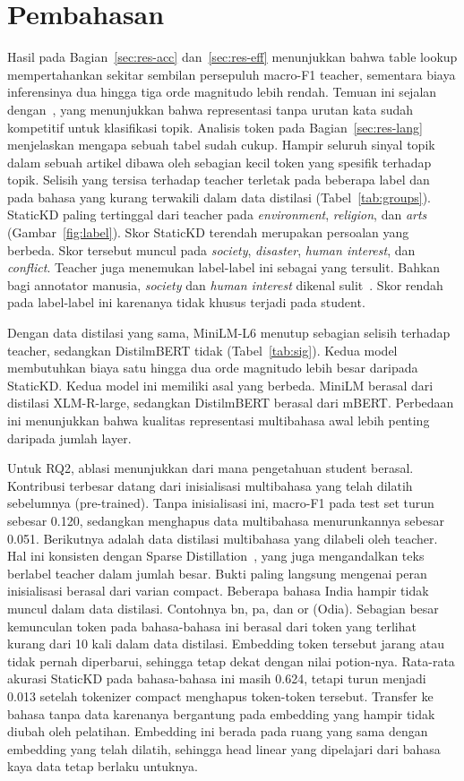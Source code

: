 \documentclass[journal]{IEEEtran}
\begin{document}
\section{Pembahasan}
\label{sec:discussion}
Hasil pada Bagian~\ref{sec:res-acc} dan~\ref{sec:res-eff} menunjukkan bahwa table lookup mempertahankan sekitar sembilan persepuluh macro-F1 teacher, sementara biaya inferensinya dua hingga tiga orde magnitudo lebih rendah. Temuan ini sejalan dengan~\cite{galke2022bow}, yang menunjukkan bahwa representasi tanpa urutan kata sudah kompetitif untuk klasifikasi topik. Analisis token pada Bagian~\ref{sec:res-lang} menjelaskan mengapa sebuah tabel sudah cukup. Hampir seluruh sinyal topik dalam sebuah artikel dibawa oleh sebagian kecil token yang spesifik terhadap topik. Selisih yang tersisa terhadap teacher terletak pada beberapa label dan pada bahasa yang kurang terwakili dalam data distilasi (Tabel~\ref{tab:groups}). StaticKD paling tertinggal dari teacher pada \emph{environment}, \emph{religion}, dan \emph{arts} (Gambar~\ref{fig:label}). Skor StaticKD terendah merupakan persoalan yang berbeda. Skor tersebut muncul pada \emph{society}, \emph{disaster}, \emph{human interest}, dan \emph{conflict}. Teacher juga menemukan label-label ini sebagai yang tersulit. Bahkan bagi annotator manusia, \emph{society} dan \emph{human interest} dikenal sulit~\cite{kuzman2025llm}. Skor rendah pada label-label ini karenanya tidak khusus terjadi pada student.

Dengan data distilasi yang sama, MiniLM-L6 menutup sebagian selisih terhadap teacher, sedangkan DistilmBERT tidak (Tabel~\ref{tab:sig}). Kedua model membutuhkan biaya satu hingga dua orde magnitudo lebih besar daripada StaticKD. Kedua model ini memiliki asal yang berbeda. MiniLM berasal dari distilasi XLM-R-large, sedangkan DistilmBERT berasal dari mBERT. Perbedaan ini menunjukkan bahwa kualitas representasi multibahasa awal lebih penting daripada jumlah layer.

Untuk RQ2, ablasi menunjukkan dari mana pengetahuan student berasal. Kontribusi terbesar datang dari inisialisasi multibahasa yang telah dilatih sebelumnya (pre-trained). Tanpa inisialisasi ini, macro-F1 pada test set turun sebesar 0.120, sedangkan menghapus data multibahasa menurunkannya sebesar 0.051. Berikutnya adalah data distilasi multibahasa yang dilabeli oleh teacher. Hal ini konsisten dengan Sparse Distillation~\cite{ye2022sparse}, yang juga mengandalkan teks berlabel teacher dalam jumlah besar. Bukti paling langsung mengenai peran inisialisasi berasal dari varian compact. Beberapa bahasa India hampir tidak muncul dalam data distilasi. Contohnya bn, pa, dan or (Odia). Sebagian besar kemunculan token pada bahasa-bahasa ini berasal dari token yang terlihat kurang dari 10 kali dalam data distilasi. Embedding token tersebut jarang atau tidak pernah diperbarui, sehingga tetap dekat dengan nilai potion-nya. Rata-rata akurasi StaticKD pada bahasa-bahasa ini masih 0.624, tetapi turun menjadi 0.013 setelah tokenizer compact menghapus token-token tersebut. Transfer ke bahasa tanpa data karenanya bergantung pada embedding yang hampir tidak diubah oleh pelatihan. Embedding ini berada pada ruang yang sama dengan embedding yang telah dilatih, sehingga head linear yang dipelajari dari bahasa kaya data tetap berlaku untuknya.
\end{document}
